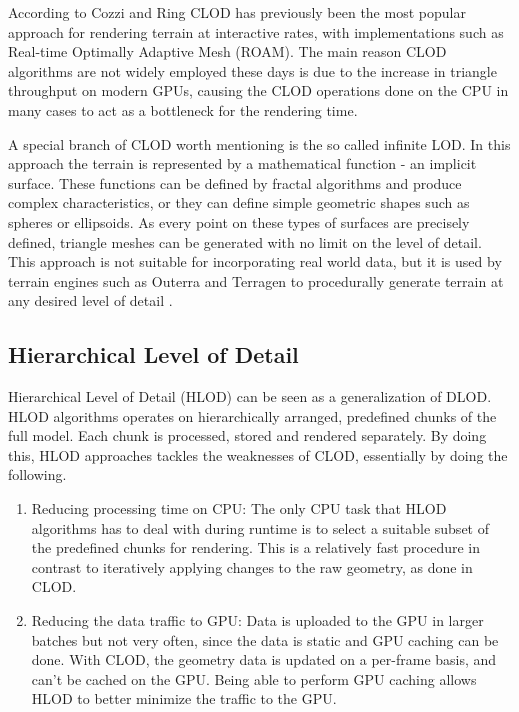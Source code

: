 According to Cozzi and Ring \cite[p. 368]{cozzi11} CLOD has previously been the most popular approach for rendering terrain at interactive rates, with implementations such as Real-time Optimally Adaptive Mesh (ROAM). The main reason CLOD algorithms are not widely employed these days is due to the increase in triangle throughput on modern GPUs, causing the CLOD operations done on the CPU in many cases to act as a bottleneck for the rendering time.

A special branch of CLOD worth mentioning is the so called infinite LOD. In this approach the terrain is represented by a mathematical function - an implicit surface. These functions can be defined by fractal algorithms and produce complex characteristics, or they can define simple geometric shapes such as spheres or ellipsoids. As every point on these types of surfaces are precisely defined, triangle meshes can be generated with no limit on the level of detail. This approach is not suitable for incorporating real world data, but it is used by terrain engines such as Outerra and Terragen to procedurally generate terrain at any desired level of detail \cite{outerraprocedural09}. 

\subsection{Hierarchical Level of Detail}
\label{section:hlod}
Hierarchical Level of Detail (HLOD) can be seen as a generalization of DLOD. HLOD algorithms operates on hierarchically arranged, predefined chunks of the full model. Each chunk is processed, stored and rendered separately. By doing this, HLOD approaches tackles the weaknesses of CLOD, essentially by doing the following.

\begin{enumerate}
    \item Reducing processing time on CPU: The only CPU task that HLOD algorithms has to deal with during runtime is to select a suitable subset of the predefined chunks for rendering. This is a relatively fast procedure in contrast to iteratively applying changes to the raw geometry, as done in CLOD.
    \item Reducing the data traffic to GPU: Data is uploaded to the GPU in larger batches but not very often, since the data is static and GPU caching can be done. With CLOD, the geometry data is updated on a per-frame basis, and can't be cached on the GPU. Being able to perform GPU caching allows HLOD to better minimize the traffic to the GPU.
\end{enumerate}

